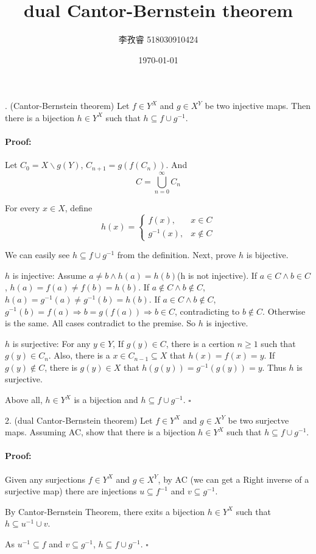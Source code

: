 \documentclass{article}
\title{dual Cantor-Bernstein theorem}
\author{李孜睿 518030910424}
\date{\today}
\newenvironment{myproof}{\ignorespaces\paragraph{Proof:}}{\hfill $\square$\par\noindent}
\begin{document}
	. (Cantor-Bernstein theorem) Let $f \in Y^X$ and $g \in X^Y$ be two injective maps. Then there is a bijection $h \in Y^X$ such that $h\subseteq f\cup g^{-1}$.
	\begin{myproof}
		Let $C_0 = X \backslash g(Y)$, $C_{n+1} = g(f(C_n))$. And $$C = \bigcup_{n=0}^{\infty}C_n$$
		
		For every $x\in X$, define
		$$h(x) = \left\{
			\begin{array}{lr}
				f(x),&x\in C\\
				g^{-1}(x),&x\notin C
			\end{array}\right.$$
		
		We can easily see $h\subseteq f\cup g^{-1}$ from the definition. Next, prove $h$ is bijective.
		
		$h$ is injective: Assume $a\neq b\wedge h(a)=h(b)$(h is not injective). If $a\in C \wedge b\in C$, $h(a) = f(a) \neq f(b) = h(b)$. If $a\notin C \wedge b\notin C$, $h(a) = g^{-1}(a) \neq g^{-1}(b) = h(b)$. If $a\in C \wedge b\notin C$, $g^{-1}(b) = f(a)\Rightarrow b = g(f(a))\Rightarrow b\in C$, contradicting to $b\notin C$. Otherwise is the same. All cases contradict to the premise. So $h$ is injective.
		
		$h$ is surjective: For any $y\in Y$, If $g(y)\in C$, there is a certion $n\geq 1$ such that $g(y)\in C_n$. Also, there is a $x\in C_{n-1}\subseteq X$ that $h(x) = f(x) = y$. If $g(y)\notin C$, there is $g(y)\in X$ that $h(g(y))=g^{-1}(g(y))=y$. Thus $h$ is surjective.
		
		Above all, $h\in Y^X$ is a bijection and $h\subseteq f\cup g^{-1}$.
	\end{myproof}
	
	2. (dual Cantor-Bernstein theorem) Let $f \in Y^X$ and $g \in X^Y$ be two surjectve maps. Assuming AC, show that there is a bijection $h \in Y^X$ such that $h\subseteq f\cup g^{-1}$.
	\begin{myproof}
		Given any surjections $f\in Y^X$ and $g\in X^Y$, by AC (we can get a Right inverse of a surjective map) there are injections $u\subseteq f^{-1}$ and $v\subseteq g^{-1}$.
		
		By Cantor-Bernstein Theorem, there exits a bijection $h\in Y^X$ such that $h\subseteq u^{-1}\cup v$.
		
		As $u^{-1}\subseteq f$ and $v\subseteq g^{-1}$, $h\subseteq f\cup g^{-1}$.
	\end{myproof}
\end{document}
